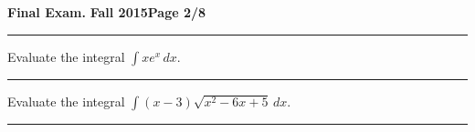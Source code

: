 \documentclass[12pt]{article}
\theoremstyle{definition}
\begin{document}
\hfill{\large\bf Final Exam.}\hfill{\large\bf
  Fall 2015}\hfill{\large\bf Page 2/8}\hrule

\bigskip
{\problem[5 pts] Evaluate the integral $\displaystyle{\int x e^x\, dx}$.}
\vspace{2cm}
\begin{flushright}
\end{flushright}
\hrule

{\problem[5 pts] Evaluate the integral $\displaystyle{\int (x-3) \sqrt{x^2-6x+5}\, dx}$.}
\vspace{2cm}
\begin{flushright}
\end{flushright}
\hrule
\end{document}
